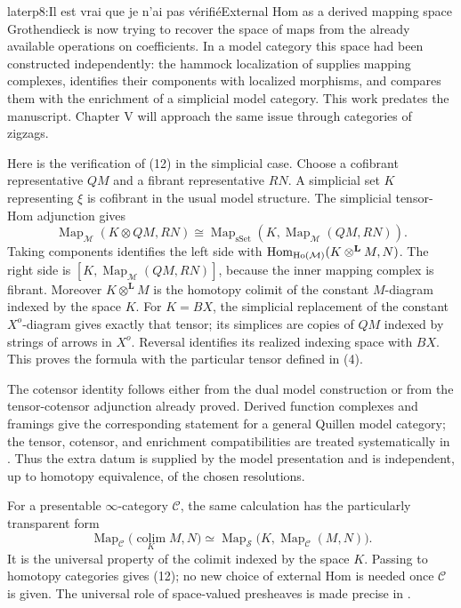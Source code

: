 \begin{dcomment}{later}{p8:Il est vrai que je n’ai pas vérifié}{External Hom as a derived mapping space}
Grothendieck is now trying to recover the space of maps from the already available operations on coefficients. In a model category this space had been constructed independently: the hammock localization of \citet[Corollary 4.2, Proposition 4.4, and Corollary 4.7]{DwyerKan1980Function} supplies mapping complexes, identifies their components with localized morphisms, and compares them with the enrichment of a simplicial model category. This work predates the manuscript. Chapter V will approach the same issue through categories of zigzags.

Here is the verification of (12) in the simplicial case. Choose a cofibrant representative \(QM\) and a fibrant representative \(RN\). A simplicial set \(K\) representing \(\xi\) is cofibrant in the usual model structure. The simplicial tensor-Hom adjunction gives
\[
 \operatorname{Map}_{\mathcal M}(K\otimes QM,RN)
 \cong
 \operatorname{Map}_{\mathrm{sSet}}
       (K,\operatorname{Map}_{\mathcal M}(QM,RN)).
\]
Taking components identifies the left side with
\(\mathrm{Hom}_{\mathrm{Ho}(\mathcal M)}(K\otimes^{\mathbf L}M,N)\).
The right side is
\([K,\operatorname{Map}_{\mathcal M}(QM,RN)]\), because the inner mapping complex is fibrant. Moreover \(K\otimes^{\mathbf L}M\) is the homotopy colimit of the constant \(M\)-diagram indexed by the space \(K\). For \(K=B X\), the simplicial replacement of the constant \(X^o\)-diagram gives exactly that tensor; its simplices are copies of \(QM\) indexed by strings of arrows in \(X^o\). Reversal identifies its realized indexing space with \(B X\). This proves the formula with the particular tensor defined in (4).

The cotensor identity follows either from the dual model construction or from the tensor-cotensor adjunction already proved. Derived function complexes and framings give the corresponding statement for a general Quillen model category; the tensor, cotensor, and enrichment compatibilities are treated systematically in \citet[Sections 10.2--10.3]{Riehl2014}. Thus the extra datum is supplied by the model presentation and is independent, up to homotopy equivalence, of the chosen resolutions.

For a presentable \(\infty\)-category \(\mathcal C\), the same calculation has the particularly transparent form
\[
 \operatorname{Map}_{\mathcal C}
 \bigl(\operatorname*{colim}_{K}M,N\bigr)
 \simeq
 \operatorname{Map}_{\mathcal S}
 \bigl(K,\operatorname{Map}_{\mathcal C}(M,N)\bigr).
\]
It is the universal property of the colimit indexed by the space \(K\). Passing to homotopy categories gives (12); no new choice of external Hom is needed once \(\mathcal C\) is given. The universal role of space-valued presheaves is made precise in \citet[Theorem 5.1.5.6]{Lurie2009HTT}.


\end{dcomment}
